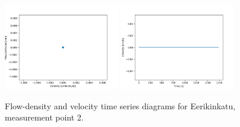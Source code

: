 \documentclass[english, 12pt, a4paper, elec, utf8, pdfa, online]{aaltothesis}
\begin{document}
\begin{figure}[ht!]
    \centering
    \includegraphics[width=0.45\textwidth]{graphs/Eerikinkatu_2_flw_dns.png}
    \includegraphics[width=0.45\textwidth]{graphs/Eerikinkatu_2_spd_time_6.png}
    \caption{Flow-density and velocity time series diagrams for Eerikinkatu, measurement point 2.}
\end{figure}
\end{document}
